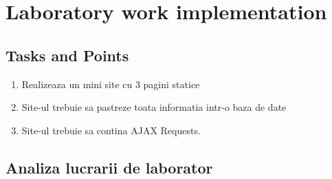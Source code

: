 \section{Laboratory work implementation}

\subsection{Tasks and Points}
\begin{enumerate}
	\item  Realizeaza un mini site cu 3 pagini statice
	\item  Site-ul trebuie sa pastreze toata informatia intr-o baza de date
	\item  Site-ul trebuie sa contina AJAX Requests.
	
\end{enumerate}

\subsection{Analiza lucrarii de laborator}


